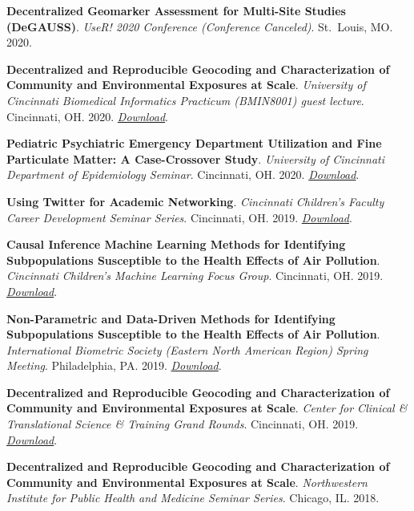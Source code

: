 \textbf{Decentralized Geomarker Assessment for Multi-Site Studies
(DeGAUSS)}. \emph{UseR! 2020 Conference (Conference Canceled)}.
St.~Louis, MO. 2020.

\textbf{Decentralized and Reproducible Geocoding and Characterization of
Community and Environmental Exposures at Scale}. \emph{University of
Cincinnati Biomedical Informatics Practicum (BMIN8001) guest lecture}.
Cincinnati, OH. 2020.
\href{https://colebrokamp-website.s3.us-east-1.amazonaws.com/talks/brokamp_degauss_2020_02_24.pdf}{\emph{Download}}.

\textbf{Pediatric Psychiatric Emergency Department Utilization and Fine
Particulate Matter: A Case-Crossover Study}. \emph{University of
Cincinnati Department of Epidemiology Seminar}. Cincinnati, OH. 2020.
\href{https://colebrokamp-website.s3.us-east-1.amazonaws.com/talks/brokamp_PM_psych_ED_2020_01_23.pdf}{\emph{Download}}.

\textbf{Using Twitter for Academic Networking}. \emph{Cincinnati
Children's Faculty Career Development Seminar Series}. Cincinnati, OH.
2019.
\href{https://colebrokamp-website.s3.amazonaws.com/talks/twitter_for_academia.html}{\emph{Download}}.

\textbf{Causal Inference Machine Learning Methods for Identifying
Subpopulations Susceptible to the Health Effects of Air Pollution}.
\emph{Cincinnati Children's Machine Learning Focus Group}. Cincinnati,
OH. 2019.
\href{https://colebrokamp-website.s3.amazonaws.com/talks/brokamp_hce_2019_11_06.pdf}{\emph{Download}}.

\textbf{Non-Parametric and Data-Driven Methods for Identifying
Subpopulations Susceptible to the Health Effects of Air Pollution}.
\emph{International Biometric Society (Eastern North American Region)
Spring Meeting}. Philadelphia, PA. 2019.
\href{https://colebrokamp-website.s3.amazonaws.com/talks/brokamp_hce_ENAR2019.pdf}{\emph{Download}}.

\textbf{Decentralized and Reproducible Geocoding and Characterization of
Community and Environmental Exposures at Scale}. \emph{Center for
Clinical \& Translational Science \& Training Grand Rounds}. Cincinnati,
OH. 2019.
\href{https://colebrokamp-website.s3.amazonaws.com/talks/brokamp_degauss_2019_15MAR2019.pdf}{\emph{Download}}.

\textbf{Decentralized and Reproducible Geocoding and Characterization of
Community and Environmental Exposures at Scale}. \emph{Northwestern
Institute for Public Health and Medicine Seminar Series}. Chicago, IL.
2018.


